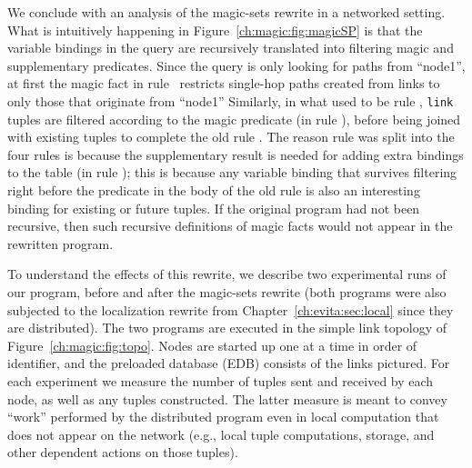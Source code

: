 We conclude with an analysis of the magic-sets rewrite in a networked setting.
What is intuitively happening in Figure~\ref{ch:magic:fig:magicSP} is that the
variable bindings in the query are recursively translated into filtering magic
and supplementary predicates.  Since the query is only looking for paths from
``node1'', at first the magic fact in rule~ restricts single-hop
paths created from links to only those that originate from ``node1'' Similarly,
in what used to be rule , {\tt link} tuples are filtered according to
the magic predicate (in rule ), before being joined with existing
 tuples to complete the old rule .  The reason rule  was
split into the four rules is because the supplementary result 
is needed for adding extra bindings to the  table (in rule
); this is because any variable binding that survives filtering
right before the  predicate in the body of the old rule  is
also an interesting binding for existing or future  tuples.  If the
original program had not been recursive, then such recursive definitions of
magic facts would not appear in the rewritten program.

To understand the effects of this rewrite, we describe two experimental runs of
our program, before and after the magic-sets rewrite (both programs were also
subjected to the localization rewrite from Chapter~\ref{ch:evita:sec:local}
since they are distributed).  The two programs are executed in the simple link
topology of Figure~\ref{ch:magic:fig:topo}.  Nodes are started up one at a time
in order of identifier, and the preloaded database (EDB) consists of the links
pictured.  For each experiment we measure the number of tuples sent and
received by each node, as well as any  tuples constructed.  The latter
measure is meant to convey ``work'' performed by the distributed program even
in local computation that does not appear on the network (e.g., local tuple
computations, storage, and other dependent actions on those tuples).

